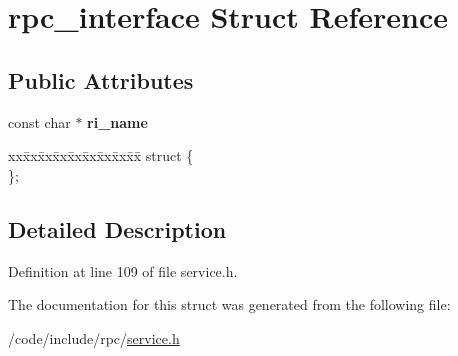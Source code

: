 \hypertarget{structrpc__interface}{}\section{rpc\+\_\+interface Struct Reference}
\label{structrpc__interface}
\subsection*{Public Attributes}
\begin{DoxyCompactItemize}
\item 
const char $\ast$ {\bfseries ri\+\_\+name}\hypertarget{structrpc__interface_a7e1b33ccc8a32e6daaf69ec6daec7bc1}{}\label{structrpc__interface_a7e1b33ccc8a32e6daaf69ec6daec7bc1}

\item 
\begin{tabbing}
xx\=xx\=xx\=xx\=xx\=xx\=xx\=xx\=xx\=\kill
struct \{\\
\}; \hypertarget{structrpc__interface_ab1864d6d78f12d027532bd9cd8e79702}{}\label{structrpc__interface_ab1864d6d78f12d027532bd9cd8e79702}
\\

\end{tabbing}\end{DoxyCompactItemize}


\subsection{Detailed Description}


Definition at line 109 of file service.\+h.



The documentation for this struct was generated from the following file\+:\begin{DoxyCompactItemize}
\item 
/code/include/rpc/\hyperlink{service_8h}{service.\+h}\end{DoxyCompactItemize}
